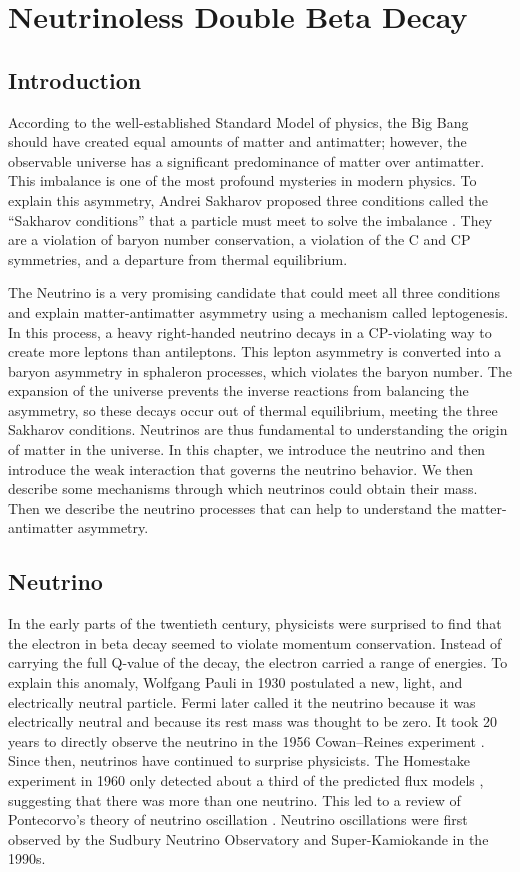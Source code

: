 \chapter{Neutrinoless Double Beta Decay}

\section{Introduction}
According to the well-established Standard Model of physics, the Big Bang should have created equal amounts of matter and antimatter; however, the observable universe has a significant predominance of matter over antimatter. This imbalance is one of the most profound mysteries in modern physics. To explain this asymmetry, Andrei Sakharov proposed three conditions called the ``Sakharov conditions'' that a particle must meet to solve the imbalance \cite{sakharov_1991}. They are a violation of baryon number conservation, a violation of the C and CP symmetries, and a departure from thermal equilibrium.

The Neutrino is a very promising candidate that could meet all three conditions and explain matter-antimatter asymmetry using a mechanism called leptogenesis. In this process, a heavy right-handed neutrino decays in a CP-violating way to create more leptons than antileptons. This lepton asymmetry is converted into a baryon asymmetry in sphaleron processes, which violates the baryon number. The expansion of the universe prevents the inverse reactions from balancing the asymmetry, so these decays occur out of thermal equilibrium, meeting the three Sakharov conditions. Neutrinos are thus fundamental to understanding the origin of matter in the universe. In this chapter, we introduce the neutrino and then introduce the weak interaction that governs the neutrino behavior. We then describe some mechanisms through which neutrinos could obtain their mass. Then we describe the neutrino processes that can help to understand the matter-antimatter asymmetry.

\section{Neutrino}
In the early parts of the twentieth century, physicists were surprised to find that the electron in beta decay seemed to violate momentum conservation. Instead of carrying the full Q-value of the decay, the electron carried a range of energies. To explain this anomaly, Wolfgang Pauli in 1930 postulated a new, light, and electrically neutral particle. Fermi later called it the neutrino because it was electrically neutral and because its rest mass was thought to be zero. It took 20 years to directly observe the neutrino in the 1956 Cowan–Reines experiment \cite{PhysRev.92.830}. Since then, neutrinos have continued to surprise physicists. The Homestake experiment in 1960 only detected about a third of the predicted flux models \cite{Cleveland:1998nv}, suggesting that there was more than one neutrino. This led to a review of Pontecorvo’s theory of neutrino oscillation \cite{Pontecorvo:1967fh}. Neutrino oscillations were first observed by the Sudbury Neutrino Observatory \cite{SNO:2001kpb} and Super-Kamiokande \cite{Super_Kamiokande_1998kpq} in the 1990s. 


